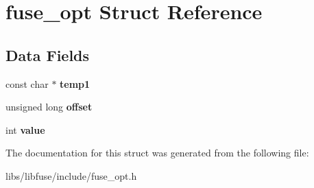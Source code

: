\hypertarget{structfuse__opt}{}\section{fuse\+\_\+opt Struct Reference}
\label{structfuse__opt}
\subsection*{Data Fields}
\begin{DoxyCompactItemize}
\item 
const char $\ast$ {\bfseries temp1}\hypertarget{structfuse__opt_a181d317421cb137dc2e15b82cbe42e44}{}\label{structfuse__opt_a181d317421cb137dc2e15b82cbe42e44}

\item 
unsigned long {\bfseries offset}\hypertarget{structfuse__opt_a333dcd849a3bd54df06084a69b5a8d39}{}\label{structfuse__opt_a333dcd849a3bd54df06084a69b5a8d39}

\item 
int {\bfseries value}\hypertarget{structfuse__opt_aeb76339e1ce6948ad94bd2d4d5d01e20}{}\label{structfuse__opt_aeb76339e1ce6948ad94bd2d4d5d01e20}

\end{DoxyCompactItemize}


The documentation for this struct was generated from the following file\+:\begin{DoxyCompactItemize}
\item 
libs/libfuse/include/fuse\+\_\+opt.\+h\end{DoxyCompactItemize}
